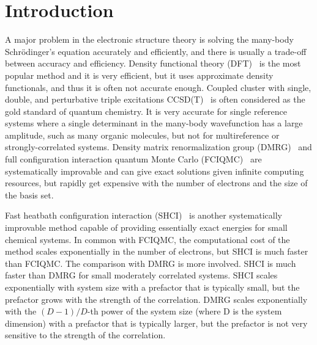 \documentclass[phd,tocprelim]{cornell}
\begin{document}
\normalspacing \setcounter{page}{1} 
\pagestyle{cornell} \addtolength{\parskip}{0.5\baselineskip}

\chapter{Introduction}
\label{ch:intro}
A major problem in the electronic structure theory is solving the many-body Schr\"{o}dinger's equation accurately and efficiently, and there is usually a trade-off between accuracy and efficiency.
Density functional theory (DFT)~\cite{ParYan-BOOK-89,DreGro-BOOK-90,kohn1999nobel} is the most popular method and it is very efficient,
but it uses approximate density functionals, and thus it is often not accurate enough.
Coupled cluster with single, double, and perturbative triple excitations CCSD(T)~\cite{raghavachari1989fifth} is often considered as the gold standard of quantum chemistry.
It is very accurate for single reference systems where a single determinant in the many-body wavefunction has a large amplitude, such as many organic molecules, but not for multireference or strongly-correlated systems.
Density matrix renormalization group (DMRG)~\cite{white1993density,white1999ab,chan2002highly,chan2011density,ShaCha-JCP-12,olivares2015ab,schollwock2005density,GuoLiCha-JCTC-18}
and full configuration interaction quantum Monte Carlo (FCIQMC)~\cite{BooThoAla-JCP-09,CleBooAla-JCP-10,PetHolChaNigUmr-PRL-12,BooGruKreAla-Nat-13,HolChaUmr-JCTC-16}
are
systematically improvable and can give exact solutions given infinite computing resources, but rapidly get expensive with the number of electrons and the size of the basis set.

Fast heatbath configuration interaction (SHCI)~\cite{HolTubUmr-JCTC-16,ShaHolJeaAlaUmr-JCTC-17,HolUmrSha-JCP-17,SmiMusHolSha-JCTC-17,MusSha-JCTC-17,ChiHolOttUmrShaZim-JPCA-18,LiOttHolShaUmr-JCP-18}
is another systematically improvable method capable of providing essentially exact energies for small chemical systems.
In common with FCIQMC, the computational cost of the method scales exponentially in the number of electrons, but SHCI is much faster than FCIQMC.
The comparison with DMRG is more involved.
SHCI is much faster than DMRG for small moderately correlated systems.
SHCI scales exponentially with system size with a prefactor that is typically small, but the prefactor grows with
the strength of the correlation.
DMRG scales exponentially with the $(D-1)/D$-th power of the system size (where D is the system dimension) with a prefactor that is typically larger,
but the prefactor is not very sensitive to the strength of the correlation.
\end{document}
